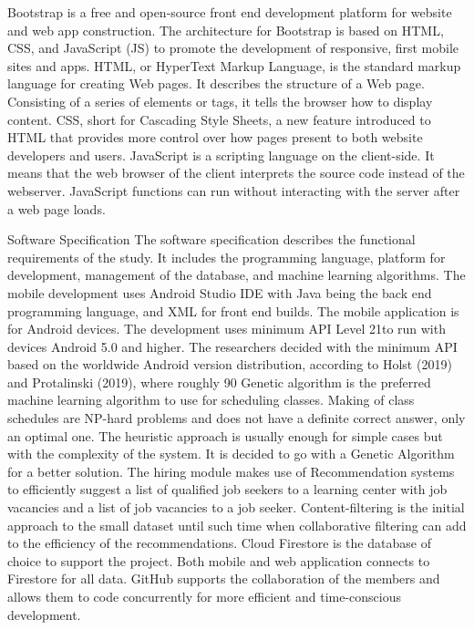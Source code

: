 Bootstrap is a free and open-source front end development platform for website and web app construction. The architecture for Bootstrap is based on HTML, CSS, and JavaScript (JS) to promote the development of responsive, first mobile sites and apps.
HTML, or HyperText Markup Language, is the standard markup language for creating Web pages. It describes the structure of a Web page. Consisting of a series of elements or tags, it tells the browser how to display content.
CSS, short for Cascading Style Sheets, a new feature introduced to HTML that provides more control over how pages present to both website developers and users.
JavaScript is a scripting language on the client-side. It means that the web browser of the client interprets the source code instead of the webserver. JavaScript functions can run without interacting with the server after a web page loads.

Software Specification
The software specification describes the functional requirements of the study. It includes the programming language, platform for development, management of the database, and machine learning algorithms.
The mobile development uses Android Studio IDE with Java being the back end programming language, and XML for front end builds. The mobile application is for Android devices. The development uses minimum API Level 21to run with devices Android 5.0 and higher. The researchers decided with the minimum API based on the worldwide Android version distribution, according to Holst (2019) and Protalinski (2019), where roughly 90%
Genetic algorithm is the preferred machine learning algorithm to use for scheduling classes. Making of class schedules are NP-hard problems and does not have a definite correct answer, only an optimal one. The heuristic approach is usually enough for simple cases but with the complexity of the system. It is decided to go with a Genetic Algorithm for a better solution.
The hiring module makes use of Recommendation systems to efficiently suggest a list of qualified job seekers to a learning center with job vacancies and a list of job vacancies to a job seeker. Content-filtering is the initial approach to the small dataset until such time when collaborative filtering can add to the efficiency of the recommendations.
Cloud Firestore is the database of choice to support the project. Both mobile and web application connects to Firestore for all data. GitHub supports the collaboration of the members and allows them to code concurrently for more efficient and time-conscious development.

